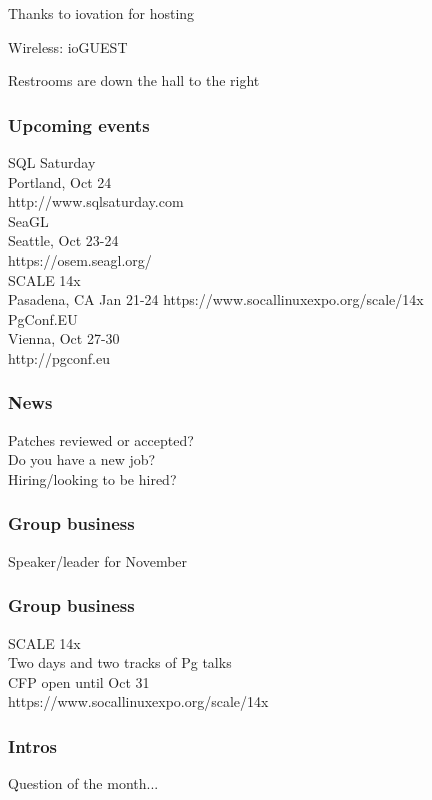 \documentclass{beamer}
\begin{document}

\frame
{
  \begin{center}
  \item[]Thanks to iovation for hosting
  \item[]Wireless: ioGUEST
  \item[]Restrooms are down the hall to the right
  \end{center}
}

\frame
{
  \frametitle{Upcoming events}
  \begin{center}
{\large SQL Saturday\\}
Portland, Oct 24\\
http://www.sqlsaturday.com\\
\vspace{5 mm}
{\large SeaGL\\}
Seattle, Oct 23-24\\
https://osem.seagl.org/\\
\vspace{5 mm}
{\large SCALE 14x\\}
Pasadena, CA Jan 21-24
https://www.socallinuxexpo.org/scale/14x\\
\vspace{5mm}
{\large PgConf.EU\\}
Vienna, Oct 27-30\\
http://pgconf.eu\
  \end{center}
}

\frame
{
  \frametitle{News}
  \begin{center}
Patches reviewed or accepted?\\
Do you have a new job?\\
Hiring/looking to be hired?\\
  \end{center}
}

\frame
{
  \frametitle{Group business}
  \begin{center}
Speaker/leader for November
  \end{center}
}

\frame
{
  \frametitle{Group business}
  \begin{center}
SCALE 14x\\
Two days and two tracks of Pg talks\\
CFP open until Oct 31\\
https://www.socallinuxexpo.org/scale/14x\\
  \end{center}
}

\frame
{
  \frametitle{Intros}
  \begin{center}
Question of the month...\\
  \end{center}
}
\end{document}
